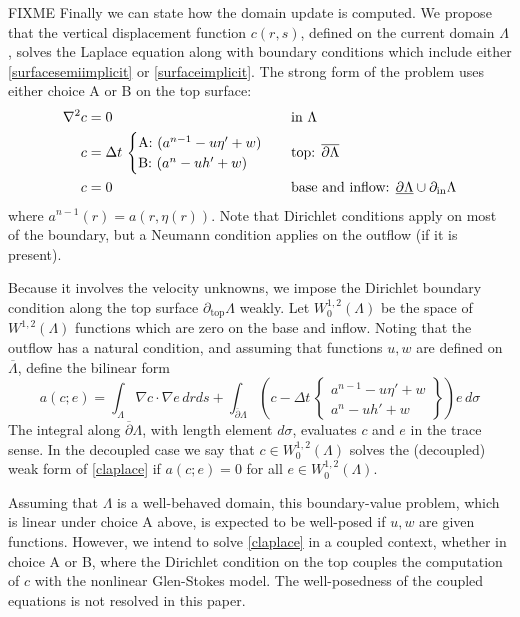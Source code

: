 \documentclass[letterpaper,final,12pt,reqno]{amsart}
\newcommand{\grad}{\nabla}
\begin{document}
FIXME Finally we can state how the domain update is computed.  We propose that the vertical displacement function $c(r,s)$, defined on the current domain $\Lambda$, solves the Laplace equation along with boundary conditions which include either \eqref{surfacesemiimplicit} or \eqref{surfaceimplicit}.  The strong form of the problem uses either choice A or B on the top surface:
\begin{align}
        \grad^2 c &= 0 &&\text{in } \Lambda \label{claplace} \\
                c &= \Delta t\,\begin{cases} \text{A: } (a^{n-1} - u \eta' + w) \\ \text{B: } (a^n - u h' + w) \end{cases} &&\text{top: } \overline{\partial \Lambda} \notag \\
                c &= 0 &&\text{base and inflow: } \underline{\partial \Lambda} \cup \partial_{\text{in}} \Lambda \notag
\end{align}
where $a^{n-1}(r) = a(r,\eta(r))$.  Note that Dirichlet conditions apply on most of the boundary, but a Neumann condition applies on the outflow (if it is present).

Because it involves the velocity unknowns, we impose the Dirichlet boundary condition along the top surface $\partial_{\text{top}} \Lambda$ weakly.  Let $W_0^{1,2}(\Lambda)$ be the space of $W^{1,2}(\Lambda)$ functions which are zero on the base and inflow.  Noting that the outflow has a natural condition, and assuming that functions $u,w$ are defined on $\overline\Lambda$, define the bilinear form
\begin{equation}
a(c;e) = \int_\Lambda \grad c \cdot \grad e \,dr ds + \int_{\overline{\partial} \Lambda} \left(c - \Delta t\,\begin{Bmatrix} a^{n-1} - u \eta' + w \\ a^n - u h' + w \end{Bmatrix}\right) e\,d\sigma \label{surfaceweakform}
\end{equation}
The integral along $\overline{\partial} \Lambda$, with length element $d\sigma$, evaluates $c$ and $e$ in the trace sense.  In the decoupled case we say that $c \in W_0^{1,2}(\Lambda)$ solves the (decoupled) weak form of \eqref{claplace} if $a(c;e)=0$ for all $e \in W_0^{1,2}(\Lambda)$.

Assuming that $\Lambda$ is a well-behaved domain, this boundary-value problem, which is linear under choice A above, is expected to be well-posed if $u,w$ are given functions.  However, we intend to solve \eqref{claplace} in a coupled context, whether in choice A or B, where the Dirichlet condition on the top couples the computation of $c$ with the nonlinear Glen-Stokes model.  The well-posedness of the coupled equations is not resolved in this paper.
\end{document}
